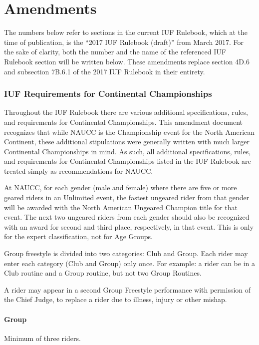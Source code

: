 \part{Amendments}
\parttoc
{}

The numbers below refer to sections in the current IUF Rulebook, which at the time of publication, is the ``2017 IUF Rulebook (draft)'' from March 2017. For the sake of clarity, both the number and the name of the referenced IUF Rulebook section will be written below. These amendments replace section 4D.6 and subsection 7B.6.1 of the 2017 IUF Rulebook in their entirety.

\section{IUF Requirements for Continental Championships}
Throughout the IUF Rulebook there are various additional specifications, rules, and requirements for Continental Championships.
This amendment document recognizes that while NAUCC is the Championship event for the North American Continent, these additional stipulations were generally written with much larger Continental Championships in mind.
As such, all additional specifications, rules, and requirements for Continental Championships listed in the IUF Rulebook are treated simply as recommendations for NAUCC.

At NAUCC, for each gender (male and female) where there are five or more geared riders in an Unlimited event, the fastest ungeared rider from that gender will be awarded with the North American Ungeared Champion title for that event.
The next two ungeared riders from each gender should also be recognized with an award for second and third place, respectively, in that event.
This is only for the expert classification, not for Age Groups.

\vspace{1cm}

Group freestyle is divided into two categories: Club and Group.
Each rider may enter each category (Club and Group) only once.
For example: a rider can be in a Club routine and a Group routine, but not two Group Routines.

A rider may appear in a second Group Freestyle performance with permission of the Chief Judge, to replace a rider due to illness, injury or other mishap.

\subsection{Group}
Minimum of three riders.

